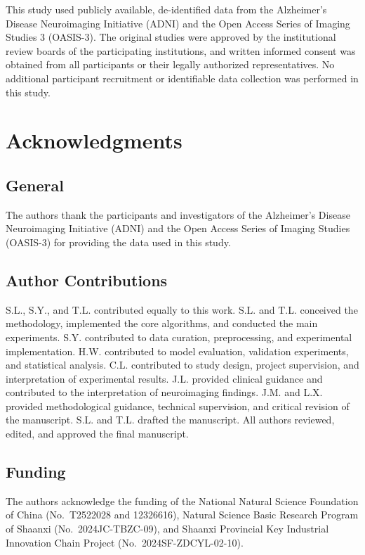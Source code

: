 \documentclass{article}
\begin{document}
This study used publicly available, de-identified data from the Alzheimer's Disease Neuroimaging Initiative (ADNI) and the Open Access Series of Imaging Studies 3 (OASIS-3). The original studies were approved by the institutional review boards of the participating institutions, and written informed consent was obtained from all participants or their legally authorized representatives. No additional participant recruitment or identifiable data collection was performed in this study.



\section*{Acknowledgments}

\subsection*{General}

The authors thank the participants and investigators of the Alzheimer's Disease Neuroimaging Initiative (ADNI) and the Open Access Series of Imaging Studies (OASIS-3) for providing the data used in this study.

\subsection*{Author Contributions}

S.L., S.Y., and T.L. contributed equally to this work. S.L. and T.L. conceived
the methodology, implemented the core algorithms, and conducted the main
experiments. S.Y. contributed to data curation, preprocessing, and experimental
implementation. H.W. contributed to model evaluation, validation experiments,
and statistical analysis. C.L. contributed to study design, project supervision,
and interpretation of experimental results. J.L. provided clinical guidance and
contributed to the interpretation of neuroimaging findings. J.M. and L.X.
provided methodological guidance, technical supervision, and critical revision
of the manuscript. S.L. and T.L. drafted the manuscript. All authors reviewed,
edited, and approved the final manuscript.

\subsection*{Funding}
The authors acknowledge the funding of the National Natural Science Foundation of China (No.~T2522028 and 12326616), Natural Science Basic Research Program of Shaanxi (No.~2024JC-TBZC-09), and Shaanxi Provincial Key Industrial Innovation Chain Project (No.~2024SF-ZDCYL-02-10).
\end{document}
